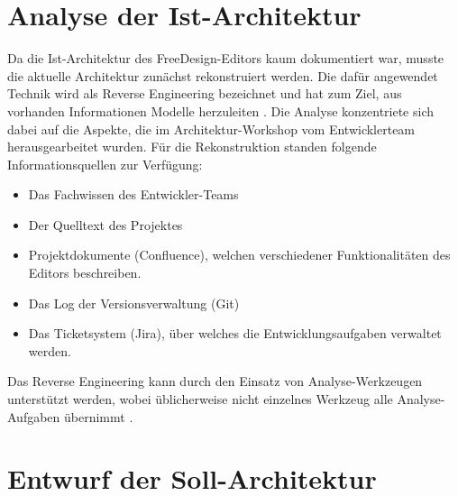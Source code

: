 \section{Analyse der Ist-Architektur}
Da die Ist-Architektur des FreeDesign-Editors kaum dokumentiert war, musste die aktuelle Architektur zunächst rekonstruiert werden. 
Die dafür angewendet Technik wird als Reverse Engineering bezeichnet und hat zum Ziel, aus vorhanden Informationen Modelle herzuleiten \autocite[vgl.][590]{LudewigLichter2013}. 
Die Analyse konzentriete sich dabei auf die Aspekte, die im Architektur-Workshop vom Entwicklerteam herausgearbeitet wurden.
Für die Rekonstruktion standen folgende Informationsquellen zur Verfügung:
\begin{itemize}
	\item Das Fachwissen des Entwickler-Teams
	\item Der Quelltext des Projektes
	\item Projektdokumente (Confluence), welchen verschiedener Funktionalitäten des Editors beschreiben. 
	\item Das Log der Versionsverwaltung (Git)
	\item Das Ticketsystem (Jira), über welches die Entwicklungsaufgaben verwaltet werden. 
\end{itemize} 

Das Reverse Engineering kann durch den Einsatz von Analyse-Werkzeugen unterstützt werden, wobei üblicherweise nicht einzelnes Werkzeug alle Analyse-Aufgaben übernimmt \autocite[vgl.][381]{Bass2013}. 


\section{Entwurf der Soll-Architektur}

